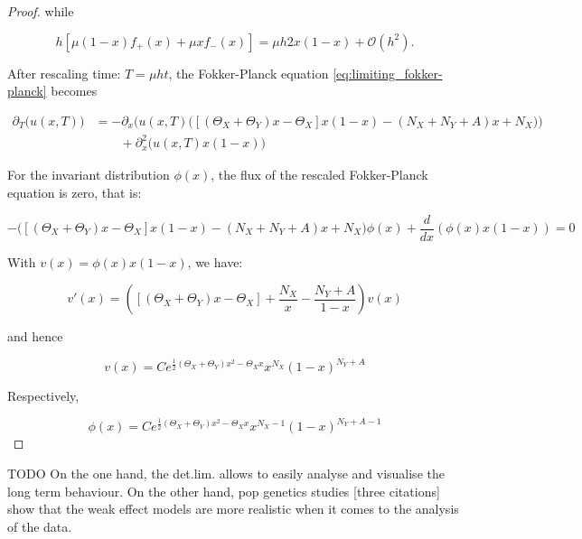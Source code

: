 \documentclass[12pt,a4paper,twoside]{article}
\begin{document}
\begin{proof}
	while 
	
	\begin{equation*}
	h\left[\mu(1-x)f_+(x) + \mu xf_-(x)\right] = \mu h 2x(1-x) + \mathcal{O}(h^2).
	\end{equation*}
	
	After rescaling time: $T = \mu h t$, the Fokker-Planck equation \eqref{eq:limiting_fokker-planck} becomes
	
	\begin{align*}
	\partial_T \big(u\left(x, T\right)\big) &= -\partial_x\Bigg(u(x,T)\Big(\left[\left(\Theta_X + \Theta_Y\right)x - \Theta_X\right]x\left(1-x\right)-\left(N_X + N_Y + A\right)x + N_X\Big)\Bigg)\\
	&\qquad + \partial^2_x\Big(u(x,T)x(1-x)\Big)
	\end{align*}
	
	For the invariant distribution $\phi(x)$, the flux of the rescaled Fokker-Planck equation is zero, that is:
	
	\begin{equation*}
	-\Big(\left[\left(\Theta_X + \Theta_Y\right)x - \Theta_X\right]x\left(1-x\right)-\left(N_X + N_Y + A\right)x + N_X\Big)\phi(x) + \frac{d}{dx}\left(\phi(x)x\left(1-x\right)\right)= 0
	\end{equation*}
	
	With $v(x) = \phi(x)x\left(1-x\right)$, we have:
	
	\begin{equation*}
	v'(x) = \left(\left[\left(\Theta_X + \Theta_Y\right)x - \Theta_X\right] + \frac{N_X}{x} - \frac{N_Y + A}{1-x}\right)v(x)
	\end{equation*}
	
	and hence
	
	\begin{equation*}
	v(x) = Ce^{\frac{1}{2}\left(\Theta_X + \Theta_Y\right)x^2 - \Theta_X x}x^{N_X}\left(1-x\right)^{N_Y+A}
	\end{equation*}
	
	Respectively,
	
	\begin{equation*}
	\phi(x) = Ce^{\frac{1}{2}\left(\Theta_X + \Theta_Y\right)x^2 - \Theta_X x}x^{N_X - 1}\left(1-x\right)^{N_Y+A - 1}
	\end{equation*}
\end{proof}
TODO
On the one hand, the det.lim. allows to easily analyse and visualise the long term behaviour. On the other hand, pop genetics studies [three citations] show that the weak effect models are more realistic when it comes to the analysis of the data.
\end{document}
